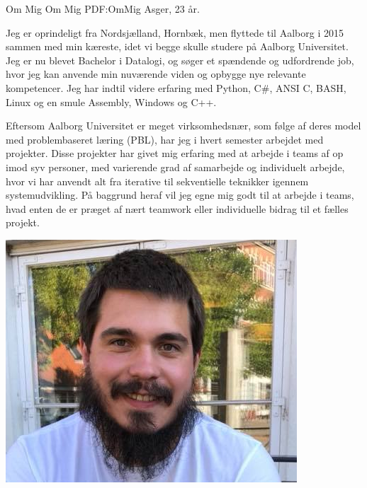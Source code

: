 
\Section
{Om Mig}
{Om Mig}
{PDF:OmMig}
Asger, 23 år.

\begin{minipage}{0.6\textwidth}%
Jeg er oprindeligt fra Nordsjælland, Hornbæk, men flyttede til Aalborg i 2015 sammen med min kæreste, idet vi begge skulle studere på Aalborg Universitet.
Jeg er nu blevet Bachelor i Datalogi, og søger et spændende og udfordrende job, hvor jeg kan anvende min nuværende viden og opbygge nye relevante kompetencer. Jeg har indtil videre erfaring med Python, C\#, ANSI C, BASH, Linux og en smule Assembly, Windows og C++.

Eftersom Aalborg Universitet er meget virksomhedsnær, som følge af deres model med problembaseret læring (PBL), har jeg i hvert semester arbejdet med projekter. Disse projekter har givet mig erfaring med at arbejde i teams af op imod syv personer, med varierende grad af samarbejde og individuelt arbejde, hvor vi har anvendt alt fra iterative til sekventielle teknikker igennem systemudvikling. På baggrund heraf vil jeg egne mig godt til at arbejde i teams, hvad enten de er præget af nært teamwork eller individuelle bidrag til et fælles projekt.
\end{minipage}%
\hfill
\includegraphics[]{Images/ProfilBilled.png}
